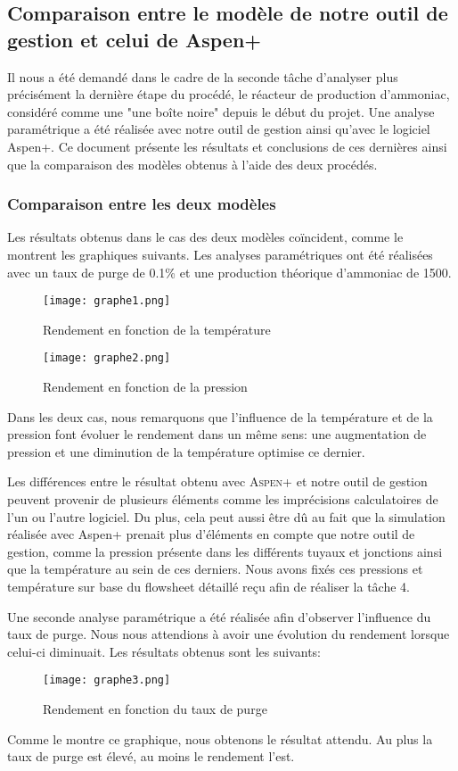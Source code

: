 
\subsection*{Comparaison entre le modèle de notre outil de gestion et celui de Aspen+}
Il nous a été demandé dans le cadre de la seconde tâche d'analyser plus précisément la dernière étape du procédé, le réacteur de production d'ammoniac, considéré comme une "une boîte noire" depuis le début du projet. Une analyse paramétrique a été réalisée avec notre outil de gestion ainsi qu'avec le logiciel Aspen+. Ce document présente les résultats et conclusions de ces dernières ainsi que la comparaison des modèles obtenus à l'aide des deux procédés.


\subsubsection*{Comparaison entre les deux modèles}
Les résultats obtenus dans le cas des deux modèles coïncident, comme le montrent les graphiques suivants. Les analyses paramétriques ont été réalisées avec un taux de purge de 0.1\% et une production théorique d'ammoniac de \unit{1500}{\tonne}.

\begin{figure}[ht!]
 \centering
 \texttt{[image: graphe1.png]}
 \caption{Rendement en fonction de la température}
 \label{scheme}
\end{figure}

\begin{figure}[ht!]
 \centering
 \texttt{[image: graphe2.png]}
 \caption{Rendement en fonction de la pression}
 \label{scheme}
\end{figure}

Dans les deux cas, nous remarquons que l'influence de la température et de la pression font évoluer le rendement dans un même sens: une augmentation de pression et une diminution de la température optimise ce dernier.


Les différences entre le résultat obtenu avec \textsc{Aspen+} et notre outil de gestion peuvent provenir de plusieurs éléments comme les imprécisions calculatoires de l'un ou l'autre logiciel. Du plus, cela peut aussi être dû au fait que la simulation réalisée avec Aspen+ prenait plus d'éléments en compte que notre outil de gestion, comme la pression présente dans les différents tuyaux et jonctions ainsi que la température au sein de ces derniers. Nous avons fixés ces pressions et température sur base du flowsheet détaillé reçu afin de réaliser la tâche 4. 

Une seconde analyse paramétrique a été réalisée afin d'observer l'influence du taux de purge. Nous nous attendions à avoir une évolution du rendement lorsque celui-ci diminuait. Les résultats obtenus sont les suivants:

\begin{figure}[ht!]
 \centering
 \texttt{[image: graphe3.png]}
 \caption{Rendement en fonction du taux de purge}
 \label{scheme}
\end{figure}

Comme le montre ce graphique, nous obtenons le résultat attendu. Au plus la taux de purge est élevé, au moins le rendement l'est.
